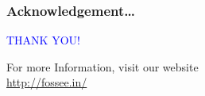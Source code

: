 \documentclass[presentation]{beamer}
\begin{document}
\begin{frame}
\frametitle{Acknowledgement\ldots{}}
\label{sec-9}

 \begin{block}{}
  \begin{center}
  \textcolor{blue}{\Large THANK YOU!} 
  \end{center}
  \end{block}
\begin{block}{}
  \begin{center}
    For more Information, visit our website\\
    \url{http://fossee.in/}
  \end{center}  
  \end{block}
\end{frame}
\end{document}
